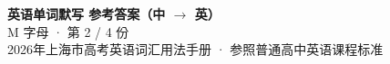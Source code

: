 \documentclass[10pt,a4paper]{article}
\begin{document}
\pagestyle{plain}

\begin{center}
{\LARGE\bfseries 英语单词默写 \quad 参考答案（中 $\to$ 英）}\\[0.22em]
{\large M 字母 · 第 2 / 4 份}\\[0.18em]
{\small 2026年上海市高考英语词汇用法手册 · 参照普通高中英语课程标准}
\end{center}

\vspace{0.2em}
\noindent{\color{rulegray}\rule{\textwidth}{0.8pt}}

\vspace{0.35em}

\vspace{0.25em}
\renewcommand{\arraystretch}{1.32}
\end{document}

